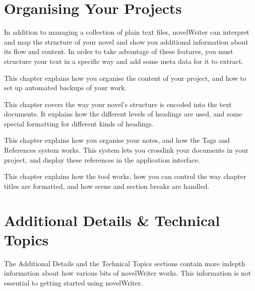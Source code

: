 \documentclass[a4paper,11pt,english]{sphinxmanual}
\begin{document}
\section{Organising Your Projects}
\label{\detokenize{int_overview:organising-your-projects}}
\sphinxAtStartPar
In addition to managing a collection of plain text files, novelWriter can interpret and map the
structure of your novel and show you additional information about its flow and content. In order
to take advantage of these features, you must structure your text in a specific way and add some
meta data for it to extract.
\begin{description}
\sphinxAtStartPar
This chapter explains how you organise the content of your project, and how to set up automated
backups of your work.

\sphinxAtStartPar
This chapter covers the way your novel’s structure is encoded into the text documents. It
explains how the different levels of headings are used, and some special formatting for
different kinds of headings.

\sphinxAtStartPar
This chapter explains how you organise your notes, and how the Tags and References system works.
This system lets you cross\sphinxhyphen{}link your documents in your project, and display these references in
the application interface.

\sphinxAtStartPar
This chapter explains how the  tool works, how you can control the way
chapter titles are formatted, and how scene and section breaks are handled.

\end{description}


\section{Additional Details \& Technical Topics}
\label{\detokenize{int_overview:additional-details-technical-topics}}
\sphinxAtStartPar
The Additional Details and the Technical Topics sections contain more in\sphinxhyphen{}depth information about
how various bits of novelWriter works. This information is not essential to getting started using
novelWriter.
\end{document}
